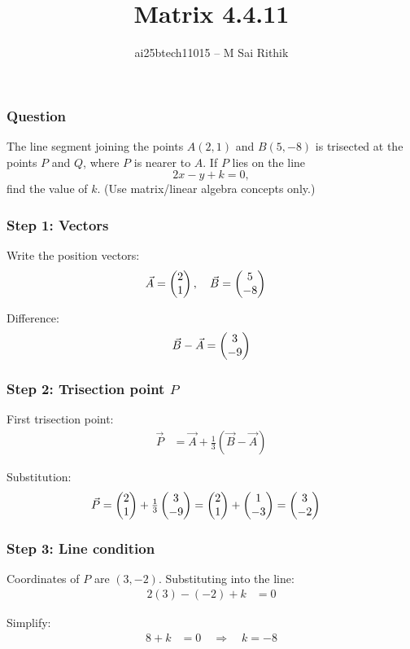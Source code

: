 \documentclass{beamer}
\title{Matrix 4.4.11}
\author{ai25btech11015 -- M Sai Rithik}
\date{}
\begin{document}
\maketitle

\begin{frame}
    \frametitle{Question}
    The line segment joining the points \(A(2,1)\) and \(B(5,-8)\) is trisected at the points \(P\) and \(Q\), where \(P\) is nearer to \(A\).  
    If \(P\) lies on the line
    \[
    2x - y + k = 0,
    \]
    find the value of \(k\).  
    (Use matrix/linear algebra concepts only.)
\end{frame}

\begin{frame}
    \frametitle{Step 1: Vectors}
    Write the position vectors:
    \begin{align}
    \Vec{A} &= \begin{pmatrix}2 \\ 1\end{pmatrix}, \quad
    \Vec{B} = \begin{pmatrix}5 \\ -8\end{pmatrix} \label{eq:AB-beamer}
    \end{align}

    Difference:
    \begin{align}
    \Vec{B} - \Vec{A} = \begin{pmatrix}3 \\ -9\end{pmatrix} \label{eq:BA-beamer}
    \end{align}
\end{frame}

\begin{frame}
    \frametitle{Step 2: Trisection point \(P\)}
    First trisection point:
    \begin{align}
    \Vec{P} &= \Vec{A} + \tfrac{1}{3}(\Vec{B}-\Vec{A}) \label{eq:Pdef-beamer}
    \end{align}

    Substitution:
    \begin{align}
    \Vec{P} &= \begin{pmatrix}2 \\ 1\end{pmatrix} + \tfrac{1}{3}\begin{pmatrix}3 \\ -9\end{pmatrix}
    = \begin{pmatrix}2 \\ 1\end{pmatrix} + \begin{pmatrix}1 \\ -3\end{pmatrix}
    = \begin{pmatrix}3 \\ -2\end{pmatrix} \label{eq:Pcoord-beamer}
    \end{align}
\end{frame}

\begin{frame}
    \frametitle{Step 3: Line condition}
    Coordinates of \(P\) are \((3,-2)\).  
    Substituting into the line:
    \begin{align}
    2(3) - (-2) + k &= 0 \label{eq:plug-beamer}
    \end{align}

    Simplify:
    \begin{align}
    8 + k &= 0 \quad \Longrightarrow \quad k = -8 \label{eq:kval-beamer}
    \end{align}
\end{frame}
\end{document}
